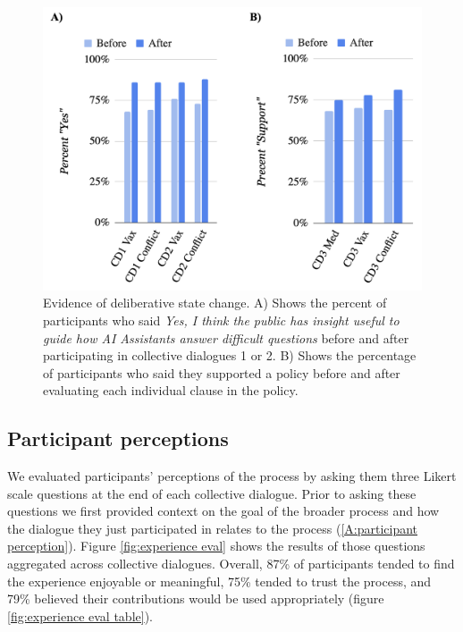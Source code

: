 \documentclass{article}
\begin{document}
\begin{figure}[H]
\centering
\begin{minipage}{.35\textwidth}
  \centering
  \caption{Evidence of deliberative state change. A) Shows the percent of participants who said \emph{Yes, I think the public has insight useful to guide how AI Assistants answer difficult questions} before and after participating in collective dialogues 1 or 2.  B) Shows the percentage of participants who said they supported a policy before and after evaluating each individual clause in the policy.}
  \label{fig:state change}
\end{minipage}
\hfill
\begin{minipage}{.63\textwidth}
  \centering
   \includegraphics[width=1\linewidth]{figs/state_change.png}
\end{minipage}
\end{figure}


\subsection{Participant perceptions}
We evaluated participants’ perceptions of the process by asking them three Likert scale questions at the end of each collective dialogue. Prior to asking these questions we first provided context on the goal of the broader process and how the dialogue they just participated in relates to the process (\ref{A:participant perception}). Figure \ref{fig:experience eval} shows the results of those questions aggregated across collective dialogues. Overall, 87\% of participants tended to find the experience enjoyable or meaningful,  75\% tended to trust the process, and 79\%  believed their contributions would be used appropriately (figure \ref{fig:experience eval table}). 
\end{document}
